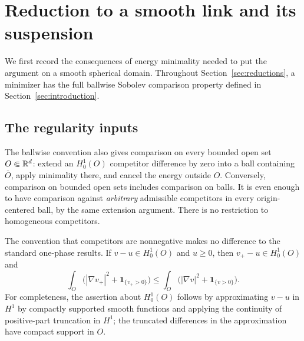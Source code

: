 \section{Reduction to a smooth link and its suspension}\label{red:section}\label{sec:reductions}

We first record the consequences of energy minimality needed to put the
argument on a smooth spherical domain.  Throughout Section~\ref{sec:reductions}, a minimizer
has the full ballwise Sobolev comparison property defined in
Section~\ref{sec:introduction}.

\subsection{The regularity inputs}\label{red:regularity-inputs}

The ballwise convention also gives comparison on every bounded open set
$O\Subset\mathbb R^d$: extend an $H^1_0(O)$ competitor difference by zero into a ball
containing $\overline O$, apply minimality there, and cancel the energy outside
$O$.  Conversely, comparison on bounded open sets includes comparison on
balls.  It is even enough to have comparison against \emph{arbitrary}
admissible competitors in every origin-centered ball, by the same extension
argument.  There is no restriction to homogeneous competitors.

The convention that competitors are nonnegative makes no difference to the
standard one-phase results.  If $v-u\in H^1_0(O)$ and $u\geq0$, then
$v_+-u\in H^1_0(O)$ and
\[
 \int_O\bigl(|\nabla v_+|^2+\mathbf 1_{\{v_+>0\}}\bigr)
 \leq
 \int_O\bigl(|\nabla v|^2+\mathbf 1_{\{v>0\}}\bigr).
\]
For completeness, the assertion about $H^1_0(O)$ follows by approximating
$v-u$ in $H^1$ by compactly supported smooth functions and applying the
continuity of positive-part truncation in $H^1$; the truncated differences
in the approximation have compact support in $O$.

